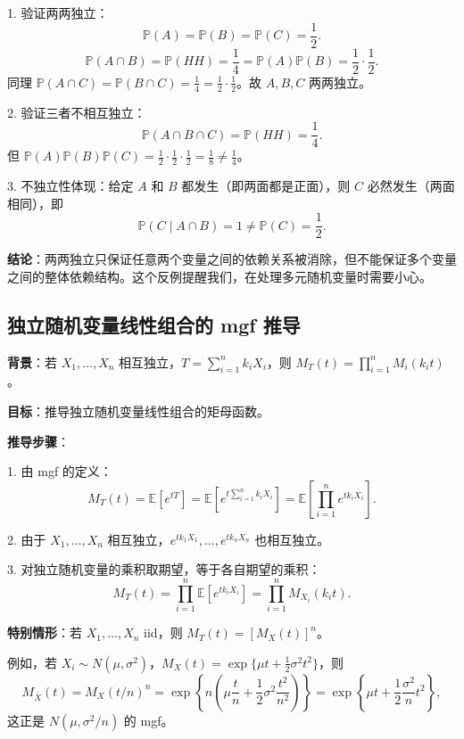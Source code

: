 1. 验证两两独立：
\[
\mathbb{P}(A) = \mathbb{P}(B) = \mathbb{P}(C) = \frac{1}{2}.
\]
\[
\mathbb{P}(A \cap B) = \mathbb{P}(HH) = \frac{1}{4} = \mathbb{P}(A)\mathbb{P}(B) = \frac{1}{2} \cdot \frac{1}{2}.
\]
同理 $\mathbb{P}(A \cap C) = \mathbb{P}(B \cap C) = \frac{1}{4} = \frac{1}{2} \cdot \frac{1}{2}$。故 $A, B, C$ 两两独立。

2. 验证三者不相互独立：
\[
\mathbb{P}(A \cap B \cap C) = \mathbb{P}(HH) = \frac{1}{4}.
\]
但 $\mathbb{P}(A)\mathbb{P}(B)\mathbb{P}(C) = \frac{1}{2} \cdot \frac{1}{2} \cdot \frac{1}{2} = \frac{1}{8} \neq \frac{1}{4}$。

3. 不独立性体现：给定 $A$ 和 $B$ 都发生（即两面都是正面），则 $C$ 必然发生（两面相同），即
\[
\mathbb{P}(C \mid A \cap B) = 1 \neq \mathbb{P}(C) = \frac{1}{2}.
\]

\textbf{结论}：两两独立只保证任意两个变量之间的依赖关系被消除，但不能保证多个变量之间的整体依赖结构。这个反例提醒我们，在处理多元随机变量时需要小心。

\subsection{独立随机变量线性组合的 mgf 推导}\label{sec:derivation-ch2-mgf-linear-combination}

\textbf{背景}：若 $X_1, \ldots, X_n$ 相互独立，$T = \sum_{i=1}^n k_i X_i$，则 $M_T(t) = \prod_{i=1}^n M_i(k_i t)$。

\textbf{目标}：推导独立随机变量线性组合的矩母函数。

\textbf{推导步骤}：

1. 由 mgf 的定义：
\[
M_T(t) = \mathbb{E}[e^{tT}] = \mathbb{E}\!\left[e^{t\sum_{i=1}^n k_i X_i}\right] = \mathbb{E}\!\left[\prod_{i=1}^n e^{t k_i X_i}\right].
\]

2. 由于 $X_1, \ldots, X_n$ 相互独立，$e^{t k_1 X_1}, \ldots, e^{t k_n X_n}$ 也相互独立。

3. 对独立随机变量的乘积取期望，等于各自期望的乘积：
\[
M_T(t) = \prod_{i=1}^n \mathbb{E}[e^{t k_i X_i}] = \prod_{i=1}^n M_{X_i}(k_i t).
\]

\textbf{特别情形}：若 $X_1, \ldots, X_n$ iid，则 $M_T(t) = [M_X(t)]^n$。

例如，若 $X_i \sim N(\mu, \sigma^2)$，$M_X(t) = \exp\{\mu t + \frac{1}{2}\sigma^2 t^2\}$，则
\[
M_{\bar{X}}(t) = M_X(t/n)^n = \exp\!\left\{ n\left(\mu \frac{t}{n} + \frac{1}{2}\sigma^2 \frac{t^2}{n^2}\right)\right\} = \exp\!\left\{\mu t + \frac{1}{2}\frac{\sigma^2}{n} t^2\right\},
\]
这正是 $N(\mu, \sigma^2/n)$ 的 mgf。

